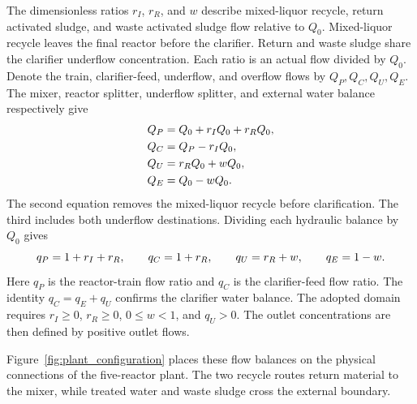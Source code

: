 The dimensionless ratios $r_I$, $r_R$, and $w$ describe mixed-liquor recycle, return activated sludge, and waste activated sludge flow relative to $Q_0$. Mixed-liquor recycle leaves the final reactor before the clarifier. Return and waste sludge share the clarifier underflow concentration. Each ratio is an actual flow divided by $Q_0$. Denote the train, clarifier-feed, underflow, and overflow flows by $Q_P,Q_C,Q_U,Q_E$. The mixer, reactor splitter, underflow splitter, and external water balance respectively give
\begin{align}
\equationname{Reactor-train flow including both recycle streams}
Q_P&=Q_0+r_IQ_0+r_RQ_0,\\
\equationname{Clarifier-feed flow after mixed-liquor recycle withdrawal}
Q_C&=Q_P-r_IQ_0,\\
\equationname{Clarifier underflow split into return sludge and waste sludge}
Q_U&=r_RQ_0+wQ_0,\\
\equationname{Effluent flow after waste withdrawal}
Q_E&=Q_0-wQ_0.
\end{align}
The second equation removes the mixed-liquor recycle before clarification. The third includes both underflow destinations. Dividing each hydraulic balance by $Q_0$ gives
\begin{equation}
\equationname{Plant flow ratios relative to fresh-influent flow}
q_P=1+r_I+r_R,\qquad q_C=1+r_R,\qquad
q_U=r_R+w,\qquad q_E=1-w.
\label{eq:plant_flows}
\end{equation}
Here $q_P$ is the reactor-train flow ratio and $q_C$ is the clarifier-feed flow ratio. The identity $q_C=q_E+q_U$ confirms the clarifier water balance. The adopted domain requires $r_I\ge0$, $r_R\ge0$, $0\le w<1$, and $q_U>0$. The outlet concentrations are then defined by positive outlet flows.

Figure~\ref{fig:plant_configuration} places these flow balances on the physical connections of the five-reactor plant. The two recycle routes return material to the mixer, while treated water and waste sludge cross the external boundary.

